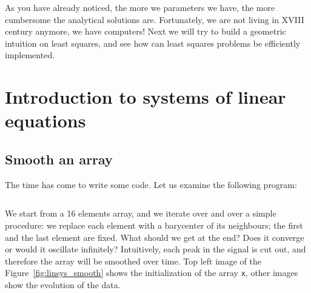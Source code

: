 \documentclass[notitlepage,oneside]{book}
\makeatletter
\newcommand{\authoredby}[1]{\addtocontents{toc}{\protect\@nameuse{authoredby#1}}}%
\makeatother
\begin{document}
As you have already noticed, the more we parameters we have, the more cumbersome the analytical solutions are.
Fortunately, we are not living in XVIII century anymore, we have computers!
Next we will try to build a geometric intuition on least squares, and see how can least squares problems be efficiently implemented.


\authoredby{B}
\chapter{Introduction to systems of linear equations}
\fancyhead[R]{\textcolor{ao(english)}{core text}}
\label{ch:linsyst}

\section{Smooth an array}
\label{sec:arraysmooth}
The time has come to write some code. Let us examine the following program:
\inputminted[frame=single,linenos=true]{python}{listings/example_3.1.py}
We start from a 16 elements array, and we iterate over and over a simple procedure: we replace each element with a barycenter of its neighbours;
the first and the last element are fixed. What should we get at the end? Does it converge or would it oscillate infinitely?
Intuitively, each peak in the signal is cut out, and therefore the array will be smoothed over time.
Top left image of the Figure~\ref{fig:linsys_smooth} shows the initialization of the array \texttt{x},
other images show the evolution of the data.
\end{document}
